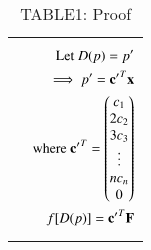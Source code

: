 \documentclass[journal,12pt,twocolumn]{IEEEtran}
\begin{document}
\begin{table*}[!t]
\begin{tabular}{|l|l|}
      & 
        \parbox{10cm}{\begin{align}
        \text{Let  }D(p)=p'\\
         \implies p'=\mathbf{c'}^T\mathbf{x}\\
         \text{where }\mathbf{c'}^T=\begin{pmatrix}c_1\\2c_2\\3c_3\\\vdots\\nc_n\\0\end{pmatrix}\\
         f[D(p)]=\mathbf{c'}^T\mathbf{F}
       \end{align}}\\
       \hline
      $(D^t f)(p)=p(b)-p(a)$ & 
         \parbox{10cm}{\begin{align}
         (D^t f)(p)=c_1(b-a)+c_2(b^2-a^2)+\\\hdots+c_n(b^n-a^n)+c_0-c_0\\
         =(c_0+c_1b+c_2b^2+\hdots+c_nb^n)-\\
         (c_0+c_1a+c_2a^2+\hdots+c_na^n)\\
         =p(b)-p(a)
       \end{align}}\\
       \hline
    \end{tabular}
    \caption*{TABLE1: Proof}
\end{table*}
\end{document}
